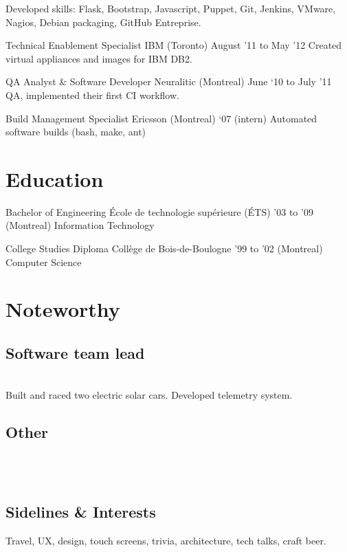 \documentclass[]{cvpn}
\begin{document}
\begin{multicols}{2}
\begin{eventlist}
{Developed skills: Flask, Bootstrap, Javascript,
Puppet, Git, Jenkins, VMware, Nagios, Debian packaging,
GitHub Entreprise.
}

\item{Technical Enablement Specialist}
     {IBM (Toronto)}
     {August '11 to May '12}
{
Created virtual appliances and images for IBM DB2.
}

\item{QA Analyst \& Software Developer}
     {Neuralitic (Montreal)}
     {June ‘10 to July ’11}
{
QA, implemented their first CI workflow.
}

\item{Build Management Specialist}
     {Ericsson (Montreal)}
     {‘07 (intern)}
{
Automated software builds (bash, make, ant)
}

\end{eventlist}

\section{Education}
\begin{eventlist}

\item{Bachelor of Engineering}
     {École de technologie supérieure (ÉTS)}
     {'03 to '09}
{
(Montreal) Information Technology
}

\item{College Studies Diploma}
     {Collège de Bois-de-Boulogne}
     {'99 to '02}
{
(Montreal) Computer Science
}

\end{eventlist}

\section{Noteworthy}

\subsection{Software team lead}
\\
Built and raced two electric solar cars.
Developed telemetry system.\\

\subsection{Other}
\\
\\

\subsection{Sidelines \& Interests}
Travel, UX, design, touch screens,
trivia, architecture, tech talks, craft beer.

\end{multicols}
\end{document}
